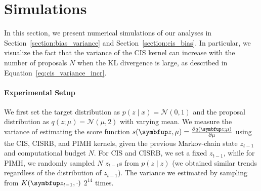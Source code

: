 
\section{Simulations}
In this section, we present numerical simulations of our analyses in Section~\ref{section:bias_variance} and Section~\ref{section:cis_bias}.
In particular, we visualize the fact that the variance of the CIS kernel can increase with the number of proposals \(N\) when the KL divergence is large, as described in Equation~\eqref{eq:cis_variance_incr}.

\paragraph{Experimental Setup}
We first set the target distribution as \(p(z \mid x) = \mathcal{N}(0, 1)\) and the proposal distribution as \(q(z; \mu) = \mathcal{N}(\mu, 2)\) with varying mean.
We measure the variance of estimating the score function \(s(\vz, \mu) = \frac{\partial q(\vz; \mu)}{\partial \mu} \) using the CIS, CISRB, and PIMH kernels, given the previous Markov-chain state \(z_{t-1}\) and computational budget \(N\).
For CIS and CISRB, we set a fixed \(z_{t-1}\), while for PIMH, we randomly sampled \(N\) \(z_{t-1}\)s from \(p(z \mid z)\) (we obtained similar trends regardless of the distribution of \(z_{t-1}\)).
The variance we estimated by sampling from \(K(\vz_{t-1}, \cdot)\) \(2^{14}\) times.


